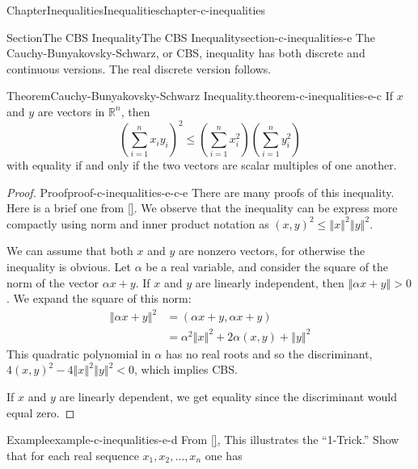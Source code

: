\documentclass[oneside,10pt,]{book}
\newcommand{\xreffont}{\relax}
\numberwithin{equation}{section}
\newcommand{\lt}{<}
\newcommand{\gt}{>}
\begin{document}
\begin{chapterptx}{Chapter}{Inequalities}{}{Inequalities}{}{}{chapter-c-inequalities}
\begin{sectionptx}{Section}{The CBS Inequality}{}{The CBS Inequality}{}{}{section-c-inequalities-e}
The Cauchy-Bunyakovsky-Schwarz, or CBS, inequality has both discrete and continuous versions.  The real discrete version follows.%
\begin{theorem}{Theorem}{Cauchy-Bunyakovsky-Schwarz Inequality.}{}{theorem-c-inequalities-e-c}%
%
%
If \(x\) and \(y\) are vectors in \(\mathbb{R}^n\), then%
\begin{equation}
\left(\sum _{i=1}^n x_i y_i\right)^2\leq \left(\sum _{i=1}^n x_i^2\right)\left(
\sum _{i=1}^n y_i^2\right)\label{men-eq-cbs}
\end{equation}
with equality if and only if the two vectors are scalar multiples of one another.%
\end{theorem}
\begin{proof}{Proof}{}{proof-c-inequalities-e-c-e}
There are many proofs of this inequality.  Here is a brief one from \hyperlink{biblio-biblio-aigner}{[{\xreffont 1}]}. We observe that the inequality can be express more compactly using norm and inner product notation as \((x, y)^2 \leq \left\Vert x \right\Vert^2 \left\Vert y \right\Vert^2 \).%
\par
We can assume that both \(x\) and \(y\) are nonzero vectors, for otherwise the inequality is obvious.  Let \(\alpha\) be a real variable, and consider the square of the norm of the vector \(\alpha x + y\).  If \(x\) and \(y\) are linearly independent, then \(\left\Vert \alpha x + y\right\Vert \gt 0\).  We expand the square of this norm:%
\begin{equation*}
\begin{split}
\left\Vert \alpha x + y \right\Vert^2 &= (\alpha x + y,\alpha x + y)\\
&  = \alpha^2 \left\Vert x \right\Vert^2 + 2 \alpha (x, y) + \left\Vert y \right\Vert^2
\end{split}
\end{equation*}
This quadratic polynomial in \(\alpha\) has no real roots and so the discriminant, \(4 (x, y)^2 - 4\left\Vert x \right\Vert^2 \left\Vert y \right\Vert^2 \lt 0\), which implies CBS.%
\par
If  \(x\) and \(y\) are linearly dependent, we get equality since the discriminant would equal zero.%
\end{proof}
\begin{example}{Example}{}{example-c-inequalities-e-d}%
From \hyperlink{biblio-biblio-steele-2004}{[{\xreffont 15}]}, This illustrates the ``1-Trick.''  Show that for each real sequence \(x_1, x_2, \dots, x_n\) one has%

\end{example}
\end{sectionptx}
\end{chapterptx}
\end{document}
